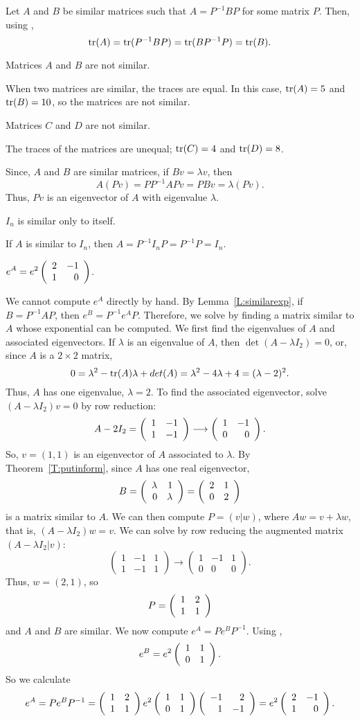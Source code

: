Let $A$ and $B$ be similar matrices such that $A = P^{-1}BP$ for some
matrix $P$.  Then, using ,
\[ {\rm tr}(A) = {\rm tr}(P^{-1}BP) = {\rm tr}(BP^{-1}P) = {\rm tr}(B). \]

\ans Matrices $A$ and $B$ are not similar.

\soln When two matrices are similar, the traces are equal.  In this case,
${\rm tr}(A) = 5$ and ${\rm tr}(B) = 10$, so the matrices are not similar.

\ans Matrices $C$ and $D$ are not similar.

\soln The traces of the matrices are unequal; ${\rm tr}(C) = 4$ and
${\rm tr}(D) = 8$.

Since, $A$ and $B$ are similar matrices, if $Bv = \lambda v$, then
\[ A(Pv) = PP^{-1}APv = PBv = \lambda (Pv). \]
Thus, $Pv$ is an eigenvector of $A$ with eigenvalue $\lambda$.

\ans $I_n$ is similar only to itself.

\soln If $A$ is similar to $I_n$, then $A = P^{-1}I_nP = P^{-1}P = I_n$.

\ans $\displaystyle e^A = e^2\left(\begin{array}{rr} 2 & -1\\ 1 &0\end{array}\right)$.

\soln We cannot compute $e^A$ directly by hand.  By Lemma~\ref{L:similarexp},
if $B = P^{-1}AP$, then $e^B = P^{-1}e^AP$.  Therefore, we solve by
finding a matrix similar to $A$ whose exponential can be computed.  
We first find the eigenvalues of $A$ and associated eigenvectors.
If $\lambda$ is an eigenvalue of $A$, then $\det(A - \lambda I_2) =
0$, or, since $A$ is a $2 \times 2$ matrix,
\[ 0 = \lambda^2 - {\rm tr}(A)\lambda + det(A) = \lambda^2 - 4\lambda +
4 = (\lambda - 2)^2. \]
Thus, $A$ has one eigenvalue, $\lambda = 2$.  To find the associated
eigenvector, solve $(A - \lambda I_2)v = 0$ by row reduction:
\[ A - 2I_2 = \left(\begin{array}{rr} 1 & -1\\ 1 &-1\end{array}\right) \longrightarrow
\left(\begin{array}{rr} 1 & -1\\ 0 &0\end{array}\right). \]
So, $v = (1,1)$ is an eigenvector of $A$ associated to $\lambda$.
By Theorem~\ref{T:putinform}, since $A$
has one real eigenvector, 
\[ B = \left(\begin{array}{rr} \lambda & 1\\ 0 &\lambda\end{array}\right) = \left(\begin{array}{rr} 2 & 1\\ 0 &2\end{array}\right) \]
is a matrix similar to $A$.  We can then compute $P = (v|w)$, where
$Aw = v + \lambda w$, that is, $(A - \lambda I_2)w = v$.  We can solve
by row reducing the augmented matrix $(A - \lambda I_2|v)$:
\[ \left(\begin{array}{rr|r} 1 & -1 & 1 \\ 1 & -1 & 1 \end{array}
\right) \longrightarrow \left(\begin{array}{rr|r} 1 & -1 & 1 \\
0 & 0 & 0 \end{array}\right). \]
Thus, $w = (2,1)$, so
\[ P = \left(\begin{array}{rr} 1 & 2\\ 1 &1\end{array}\right) \]
and $A$ and $B$ are similar.
We now compute $e^A = Pe^BP^{-1}$.  Using ,
\[ e^B = e^2\left(\begin{array}{rr} 1 & 1\\ 0 &1\end{array}\right). \]
So we calculate 
\[ e^A = Pe^BP^{-1} = \left(\begin{array}{rr} 1 & 2\\ 1 &1\end{array}\right)e^2\left(\begin{array}{rr} 1 & 1\\ 0 &1\end{array}\right)
\left(\begin{array}{rr} -1 & 2\\ 1 &-1\end{array}\right) = e^2\left(\begin{array}{rr} 2 & -1\\ 1 &0\end{array}\right). \]


